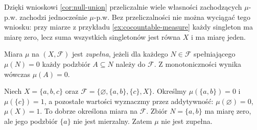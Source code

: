 \begin{uwaga}
Dzięki wnioskowi \ref{cor:null-union} przeliczalnie wiele
własności zachodzących $\mu$-p.w. zachodzi jednocześnie
$\mu$-p.w. Bez przeliczalności nie można wyciągać tego
wniosku: przy miarze z przykładu \ref{ex:cocountable-measure}
każdy singleton ma miarę zero, lecz suma wszystkich singletonów
jest równa $X$ i ma miarę jeden.
\end{uwaga}

\begin{definicja}
\label{def:complete-measure}
Miara $\mu$ na $(X,\mathcal F)$ jest \emph{zupełna}, jeżeli
dla każdego $N\in\mathcal F$ spełniającego $\mu(N)=0$
każdy podzbiór $A\subseteq N$ należy do $\mathcal F$.
Z monotoniczności wynika wówczas $\mu(A)=0$.
\end{definicja}

\begin{przyklad}
\label{ex:incomplete-measure}
Niech $X=\{a,b,c\}$ oraz
$\mathcal F=\{\varnothing,\{a,b\},\{c\},X\}$.
Określmy $\mu(\{a,b\})=0$ i $\mu(\{c\})=1$,
a pozostałe wartości wyznaczmy przez addytywność:
$\mu(\varnothing)=0$, $\mu(X)=1$.
To dobrze określona miara na $\mathcal F$.
Zbiór $N=\{a,b\}$ ma miarę zero, ale jego podzbiór
$\{a\}$ nie jest mierzalny. Zatem $\mu$ nie jest zupełna.
\end{przyklad}

